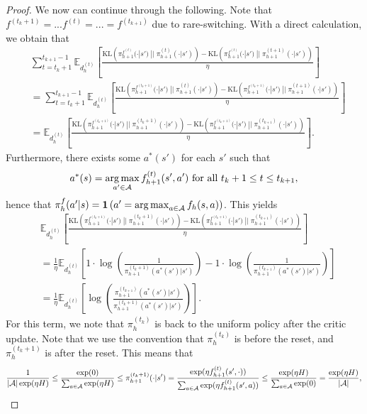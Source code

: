 \begin{proof}
We now can continue through the following. Note that $f^{(t_k+1)} = ... f^{(t)} = ... = f^{(t_{k+1})}$ due to rare-switching. With a direct calculation, we obtain that
\begin{align}\label{eqn:decom-nora-5}
    & \sum_{t=t_k+1}^{t_{k+1}-1} \mathbb{E}_{d_h^{(t)}}\left[ \frac{\text{KL}\left(\pi_{h+1}^{f^{(t)}}(\cdot | s')\; || \;\pi_{h+1}^{(t)}(\cdot | s')\right) - \text{KL}\left(\pi_{h+1}^{f^{(t)}}(\cdot | s')\; || \;\pi_{h+1}^{(t+1)}(\cdot | s')\right)}{\eta} \right]\nonumber\\
    & = \sum_{t=t_k+1}^{t_{k+1}-1} \mathbb{E}_{d_h^{(t)}}\left[ \frac{\text{KL}\left(\pi_{h+1}^{f^{(t_k+1)}}(\cdot | s')\; || \;\pi_{h+1}^{(t)}(\cdot | s')\right) - \text{KL}\left(\pi_{h+1}^{f^{(t_k+1)}}(\cdot | s')\; || \;\pi_{h+1}^{(t+1)}(\cdot | s')\right)}{\eta} \right]\nonumber\\
    & = \mathbb{E}_{d_h^{(t)}}\left[ \frac{\text{KL}\left(\pi_{h+1}^{f^{(t_k+1)}}(\cdot | s')\; || \;\pi_{h+1}^{(t_k+1)}(\cdot | s')\right) - \text{KL}\left(\pi_{h+1}^{f^{(t_k+1)}}(\cdot | s')\; || \;\pi_{h+1}^{(t_{k+1})}(\cdot | s')\right)}{\eta} \right].
\end{align} 
Furthermore, there exists some $a^*(s')$ for each $s'$ such that
$$a^*(s) = \operatorname*{arg\,max}_{a' \in {\mathcal{A}}} f_{h+1}^{(t)}(s',a') \text{ for all } t_k+1 \leq t \leq t_{k+1},$$
hence that $\pi_h^f(a' | s) = \mathbf{1}\left(a' = \operatorname*{arg\,max}_{a \in {\mathcal{A}}} f_h(s,a)\right)$. This yields
\begin{align}\label{eqn:decom-nora-6}
    &\mathbb{E}_{d_h^{(t)}}\left[ \frac{\text{KL}\left(\pi_{h+1}^{f^{(t_k+1)}}(\cdot | s')\; || \;\pi_{h+1}^{(t_k+1)}(\cdot | s')\right) - \text{KL}\left(\pi_{h+1}^{f^{(t_k+1)}}(\cdot | s')\; || \;\pi_{h+1}^{(t_{k+1})}(\cdot | s')\right)}{\eta} \right]\nonumber\\ 
    &= \frac{1}{\eta}\mathbb{E}_{d_h^{(t)}}\left[1 \cdot \log\left(\frac{1}{\pi_{h+1}^{(t_k+1)} ( a^*(s') | s')}\right) - 1 \cdot \log\left(\frac{1}{\pi_{h+1}^{(t_{k+1})} ( a^*(s') | s')}\right)\right]\nonumber\\
    &=\frac{1}{\eta}\mathbb{E}_{d_h^{(t)}}\left[\log\left(\frac{\pi_{h+1}^{(t_{k+1})} ( a^*(s') | s')}{\pi_{h+1}^{(t_k+1)} ( a^*(s') | s')}\right)\right].
\end{align}
For this term, we note that $\pi_h^{(t_k)}$ is back to the uniform policy after the critic update. Note that we use the convention that $\pi_h^{(t_k)}$ is before the reset, and $\pi_h^{(t_k+1)}$ is after the reset. This means that
$$\frac{1}{|{\mathcal{A}}|\exp(\eta H)} \leq \frac{\exp(0)}{\sum_{a \in {\mathcal{A}}}\exp(\eta H)} \leq \pi_{h+1}^{(t_k+1)}(\cdot | s') = \frac{ \exp(\eta f_{h+1}^{(t)}(s', \cdot))}{\sum_{a \in {\mathcal{A}}}\exp(\eta f_{h+1}^{(t)}(s', a))} \leq \frac{\exp(\eta H)}{\sum_{a \in {\mathcal{A}}} \exp(0)} = \frac{\exp(\eta H)}{|{\mathcal{A}}|},$$

\end{proof}
